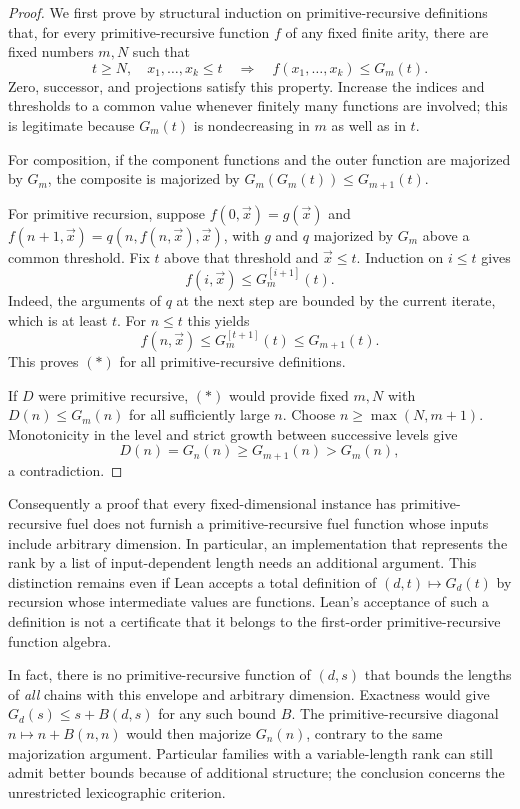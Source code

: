 \begin{proof}
We first prove by structural induction on primitive-recursive
definitions that, for every primitive-recursive function $f$ of any
fixed finite arity, there are fixed numbers $m,N$ such that
\[
 t\ge N,\quad x_1,\ldots,x_k\le t
 \quad\Longrightarrow\quad f(x_1,\ldots,x_k)\le G_m(t).
 \tag{$*$}
\]
Zero, successor, and projections satisfy this property.  Increase the
indices and thresholds to a common value whenever finitely many
functions are involved; this is legitimate because $G_m(t)$ is
nondecreasing in $m$ as well as in $t$.

For composition, if the component functions and the outer function are
majorized by $G_m$, the composite is majorized by
$G_m(G_m(t))\le G_{m+1}(t)$.

For primitive recursion, suppose
$f(0,\vec x)=g(\vec x)$ and
$f(n+1,\vec x)=q(n,f(n,\vec x),\vec x)$, with $g$ and $q$ majorized by
$G_m$ above a common threshold.  Fix $t$ above that threshold and
$\vec x\le t$.  Induction on $i\le t$ gives
\[
 f(i,\vec x)\le G_m^{[i+1]}(t).
\]
Indeed, the arguments of $q$ at the next step are bounded by the current
iterate, which is at least $t$.  For $n\le t$ this yields
\[
 f(n,\vec x)\le G_m^{[t+1]}(t)\le G_{m+1}(t).
\]
This proves $(*)$ for all primitive-recursive definitions.

If $D$ were primitive recursive, $(*)$ would provide fixed $m,N$ with
$D(n)\le G_m(n)$ for all sufficiently large $n$.  Choose
$n\ge\max(N,m+1)$.  Monotonicity in the level and strict growth between
successive levels give
\[
 D(n)=G_n(n)\ge G_{m+1}(n)>G_m(n),
\]
a contradiction.
\end{proof}

Consequently a proof that every fixed-dimensional instance has
primitive-recursive fuel does not furnish a primitive-recursive fuel
function whose inputs include arbitrary dimension.  In particular, an
implementation that represents the rank by a list of input-dependent
length needs an additional argument.  This distinction remains even if
Lean accepts a total definition of $(d,t)\mapsto G_d(t)$ by recursion
whose intermediate values are functions.  Lean's acceptance of such a
definition is not a certificate that it belongs to the first-order
primitive-recursive function algebra.

In fact, there is no primitive-recursive function of $(d,s)$ that bounds
the lengths of \emph{all} chains with this envelope and arbitrary
dimension.  Exactness would give
$G_d(s)\le s+B(d,s)$ for any such bound $B$.  The primitive-recursive
diagonal $n\mapsto n+B(n,n)$ would then majorize $G_n(n)$, contrary to
the same majorization argument.  Particular families with a
variable-length rank can still admit better bounds because of
additional structure; the conclusion concerns the unrestricted
lexicographic criterion.

